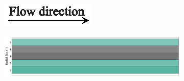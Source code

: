\documentclass[preprint,12pt]{elsarticle}
\begin{document}
\begin{figure}[h!]
     \centering
     \begin{subfigure}[b]{\textwidth}
     	\includegraphics[width=\textwidth]{flow_dir.eps}
     \end{subfigure}
     \begin{subfigure}[b]{0.85\textwidth}
\includegraphics[width=\textwidth]{results/segments/5seg/60C40T/seg.png}
     \end{subfigure}
     \hfill
     \begin{subfigure}[b]{0.1\textwidth}

\end{subfigure}
\end{figure}
\end{document}
